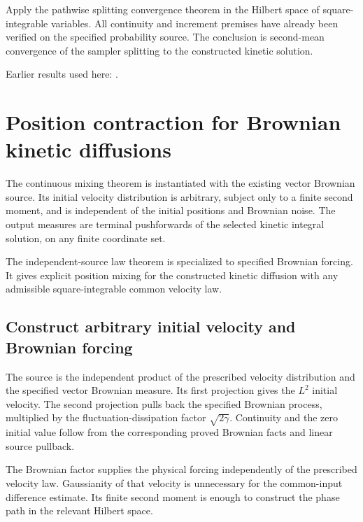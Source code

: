 \documentclass[11pt,a4paper]{report}
\begin{document}
Apply the pathwise splitting convergence theorem in the Hilbert space of square-integrable variables. All continuity and increment premises have already been verified on the specified probability source. The conclusion is second-mean convergence of the sampler splitting to the constructed kinetic solution.



Earlier results used here: \cite[Section~3.8.17]{LangevinLean2026ULASC}.
\section{\texorpdfstring{Position contraction for Brownian kinetic diffusions}{Position contraction for Brownian kinetic diffusions}}
\label{proof-module-KineticLangevin-CanonicalContinuousMixing-lean}


The continuous mixing theorem is instantiated with the existing vector Brownian source. Its initial velocity distribution is arbitrary, subject only to a finite second moment, and is independent of the initial positions and Brownian noise. The output measures are terminal pushforwards of the selected kinetic integral solution, on any finite coordinate set.



The independent-source law theorem is specialized to specified Brownian forcing. It gives explicit position mixing for the constructed kinetic diffusion with any admissible square-integrable common velocity law.

\subsection{\texorpdfstring{Construct arbitrary initial velocity and Brownian forcing}{Construct arbitrary initial velocity and Brownian forcing}}
\label{report-step-KineticLangevin-CanonicalContinuousMixing-lean-1}


The source is the independent product of the prescribed velocity distribution and the specified vector Brownian measure. Its first projection gives the \(L^{2}\) initial velocity. The second projection pulls back the specified Brownian process, multiplied by the fluctuation-dissipation factor \(\sqrt{2\gamma}\). Continuity and the zero initial value follow from the corresponding proved Brownian facts and linear source pullback.



The Brownian factor supplies the physical forcing independently of the prescribed velocity law. Gaussianity of that velocity is unnecessary for the common-input difference estimate. Its finite second moment is enough to construct the phase path in the relevant Hilbert space.
\end{document}
